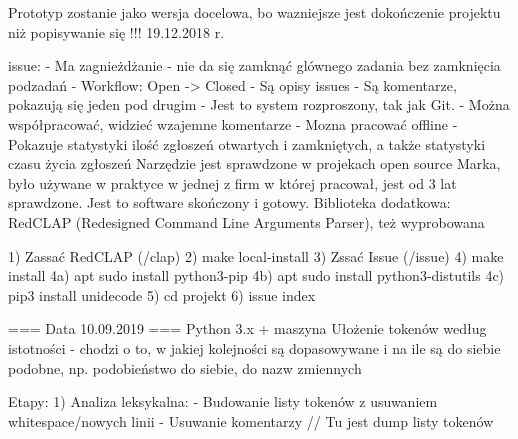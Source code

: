 \documentclass[11pt,oneside,a4paper,titlepage,onecolumn]{article}
\begin{document}
Prototyp zostanie jako wersja docelowa, bo wazniejsze jest dokończenie projektu niż popisywanie się !!! 19.12.2018 r.

issue:
- Ma zagnieżdżanie - nie da się zamknąć glównego zadania bez zamknięcia podzadań
- Workflow: Open -> Closed
- Są opisy issues
- Są komentarze, pokazują się jeden pod drugim
- Jest to system rozproszony, tak jak Git.
- Można współpracować, widzieć wzajemne komentarze
- Mozna pracować offline
- Pokazuje statystyki ilość zgłoszeń otwartych i zamkniętych, a także statystyki czasu życia zgłoszeń
Narzędzie jest sprawdzone w projekach open source Marka, było używane w praktyce w jednej z firm w której pracował, jest od 3 lat sprawdzone. Jest to software skończony i gotowy.
Biblioteka dodatkowa: RedCLAP (Redesigned Command Line Arguments Parser), też wyprobowana

1) Zassać RedCLAP (/clap)
2) make local-install
3) Zssać Issue (/issue)
4) make install
4a) apt sudo install python3-pip
4b) apt sudo install python3-distutils
4c) pip3 install unidecode
5) cd projekt
6) issue index

=== Data 10.09.2019 ===
Python 3.x + maszyna
Ułożenie tokenów według istotności - chodzi o to, w jakiej kolejności są dopasowywane i na ile są do siebie podobne, np. podobieństwo do siebie, do nazw zmiennych

Etapy:
1) Analiza leksykalna:
  - Budowanie listy tokenów z usuwaniem whitespace/nowych linii
  - Usuwanie komentarzy
  // Tu jest dump listy tokenów
  
\end{document}
